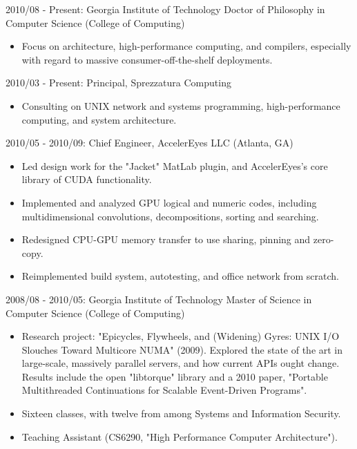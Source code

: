 \documentclass{article}
\begin{document}
2010/08 - Present: Georgia Institute of Technology
Doctor of Philosophy in Computer Science (College of Computing)

\begin{itemize}
\item Focus on architecture, high-performance computing, and compilers,
  especially with regard to massive consumer-off-the-shelf deployments.
\end{itemize}

2010/03 - Present: Principal, Sprezzatura Computing

\begin{itemize}
\item Consulting on UNIX network and systems programming, high-performance
  computing, and system architecture.
\end{itemize}

2010/05 - 2010/09: Chief Engineer, AccelerEyes LLC (Atlanta, GA)
\begin{itemize}
\item Led design work for the "Jacket" MatLab plugin, and AccelerEyes's core library of CUDA functionality.
\item Implemented and analyzed GPU logical and numeric codes, including multidimensional convolutions, decompositions, sorting and searching.
\item Redesigned CPU-GPU memory transfer to use sharing, pinning and zero-copy.
\item Reimplemented build system, autotesting, and office network from scratch.
\end{itemize}

2008/08 - 2010/05: Georgia Institute of Technology
Master of Science in Computer Science (College of Computing)

\begin{itemize}
\item Research project: "Epicycles, Flywheels, and (Widening) Gyres: UNIX I/O
  Slouches Toward Multicore NUMA" (2009). Explored the state of the art in
  large-scale, massively parallel servers, and how current APIs ought
  change. Results include the open "libtorque" library and a 2010 paper,
  "Portable Multithreaded Continuations for Scalable Event-Driven Programs".
\item Sixteen classes, with twelve from among Systems and Information Security.
\item Teaching Assistant (CS6290, "High Performance Computer Architecture").
\end{itemize}
\end{document}
